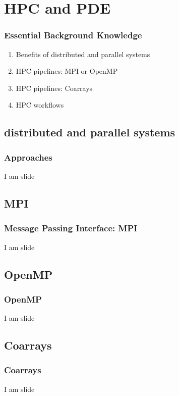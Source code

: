 % 

\section{HPC and PDE}
%
\begin{frame}\frametitle{Essential Background Knowledge}
\begin{enumerate}
	\item Benefits of distributed and parallel systems
	\item HPC pipelines:  MPI or OpenMP
	\item HPC pipelines:  Coarrays
	\item HPC workflows
\end{enumerate}
\end{frame}

\subsection{distributed and parallel systems}
\begin{frame}\frametitle{Approaches}
	I am slide
\end{frame}

\subsection{MPI}
\begin{frame}\frametitle{Message Passing Interface: MPI}
	I am slide
\end{frame}

\subsection{OpenMP}
\begin{frame}\frametitle{OpenMP}
	I am slide
\end{frame}

\subsection{Coarrays}
\begin{frame}\frametitle{Coarrays}
	I am slide
\end{frame}

\endinput  %
